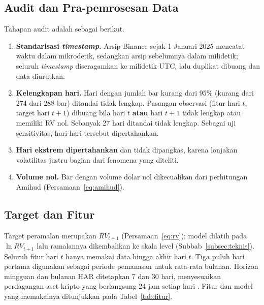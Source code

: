 \subsection{Audit dan Pra-pemrosesan Data}
\label{subsec:audit}
Tahapan audit adalah sebagai berikut.
\begin{enumerate}
  \item \textbf{Standarisasi \textit{timestamp}.} Arsip Binance sejak
        1 Januari 2025 mencatat waktu dalam mikrodetik, sedangkan arsip
        sebelumnya dalam milidetik; seluruh \textit{timestamp} diseragamkan ke
        milidetik UTC, lalu duplikat dibuang dan data diurutkan.
  \item \textbf{Kelengkapan hari.} Hari dengan jumlah bar kurang dari 95\%
        (kurang dari 274 dari 288 bar) ditandai tidak lengkap. Pasangan
        observasi (fitur hari $t$, target hari $t+1$) dibuang bila hari $t$
        \textbf{atau} hari $t+1$ tidak lengkap atau memiliki RV nol. Sebanyak
        27 hari ditandai tidak lengkap. Sebagai uji sensitivitas, hari-hari
        tersebut dipertahankan.
  \item \textbf{Hari ekstrem dipertahankan} dan tidak dipangkas, karena
        lonjakan volatilitas justru bagian dari fenomena yang diteliti.
  \item \textbf{Volume nol.} Bar dengan volume dolar nol dikecualikan dari
        perhitungan Amihud (Persamaan~\eqref{eq:amihud}).
\end{enumerate}

\subsection{Target dan Fitur}
\label{subsec:fitur}
Target peramalan merupakan $RV_{t+1}$ (Persamaan~\eqref{eq:rv}); model dilatih
pada $\ln RV_{t+1}$ lalu ramalannya dikembalikan ke skala level
(Subbab~\ref{subsec:teknis}). Seluruh fitur hari $t$ hanya memakai data hingga
akhir hari $t$. Tiga puluh hari pertama digunakan sebagai periode pemanasan
untuk rata-rata bulanan. Horizon mingguan dan bulanan HAR ditetapkan 7 dan
30 hari, menyesuaikan perdagangan aset kripto yang berlangsung 24 jam setiap
hari \cite{qiu2025}. Fitur dan model yang memakainya ditunjukkan pada
Tabel~\ref{tab:fitur}.

